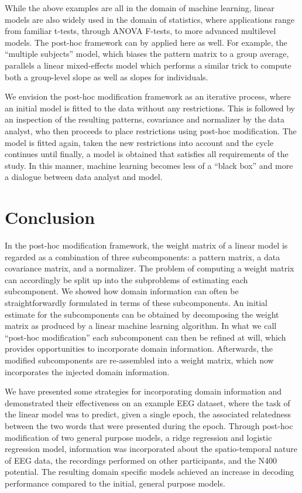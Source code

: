 \documentclass[a4paper]{vanvliet_paper}
\begin{document}
While the above examples are all in the domain of machine learning, linear models are also widely used in the domain of statistics, where applications range from familiar t-tests, through ANOVA F-tests, to more advanced multilevel models.
The post-hoc framework can by applied here as well.
For example, the ``multiple subjects'' model, which biases the pattern matrix to a group average, parallels a linear mixed-effects model which performs a similar trick to compute both a group-level slope as well as slopes for individuals\cite{Baayen2008}.

We envision the post-hoc modification framework as an iterative process, where an initial model is fitted to the data without any restrictions.
This is followed by an inspection of the resulting patterns, covariance and normalizer by the data analyst, who then proceeds to place restrictions using post-hoc modification.
The model is fitted again, taken the new restrictions into account and the cycle continues until finally, a model is obtained that satisfies all requirements of the study.
In this manner, machine learning becomes less of a ``black box'' and more a dialogue between data analyst and model.


\section{Conclusion}\label{conclusion}

In the post-hoc modification framework, the weight matrix of a linear model is regarded as a combination of three subcomponents: a pattern matrix, a data covariance matrix, and a normalizer.
The problem of computing a weight matrix can accordingly be split up into the subproblems of estimating each subcomponent.
We showed how domain information can often be straightforwardly formulated in terms of these subcomponents.
An initial estimate for the subcomponents can be obtained by decomposing the weight matrix as produced by a linear machine learning algorithm.
In what we call ``post-hoc modification'' each subcomponent can then be refined at will, which provides opportunities to incorporate domain information.
Afterwards, the modified subcomponents are re-assembled into a weight matrix, which now incorporates the injected domain information.

We have presented some strategies for incorporating domain information and demonstrated their effectiveness on an example \gls{EEG} dataset, where the task of the linear model was to predict, given a single epoch, the associated relatedness between the two words that were presented during the epoch.
Through post-hoc modification of two general purpose models, a ridge regression and logistic regression model, information was incorporated about the spatio-temporal nature of \gls{EEG} data, the recordings performed on other participants, and the N400 potential.
The resulting domain specific models achieved an increase in decoding performance compared to the initial, general purpose models.  
\end{document}
